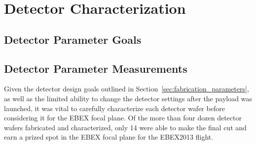\chapter{Detector Characterization}
\label{charecterization_chapter}




\section{Detector Parameter Goals}
\label{parameter_goals_section}



\section{Detector Parameter Measurements}
\label{parameter_measurements_section}



Given the detector design goals outlined in Section~\ref{sec:fabrication_parameters}, as well as the limited ability to change the detector settings after the payload was launched, it was vital to carefully characterize each detector wafer before considering it for the \ac{EBEX} focal plane. 
Of the more than four dozen detector wafers fabricated and characterized, only 14 were able to make the final cut and earn a prized spot in the \ac{EBEX} focal plane for the \ac{EBEX2013} flight. 

